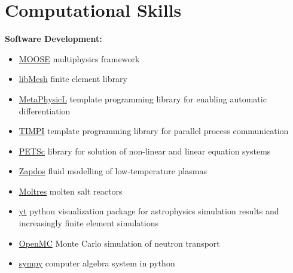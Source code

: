 \documentclass[a4paper,10pt]{article} %
\newcounter{magicrownumbers}
\begin{document}



\setcounter{magicrownumbers}{0}



\FloatBarrier


\section{Computational Skills}

\textbf{Software Development:}
\begin{itemize}[noitemsep]
\item \href{https://github.com/idaholab/moose}{MOOSE} multiphysics framework
\item \href{https://github.com/libmesh/libmesh}{libMesh} finite element library
\item \href{https://github.com/roystgnr/metaphysicl}{MetaPhysicL} template
  programming library for enabling automatic differentiation
\item \href{https://github.com/libmesh/timpi}{TIMPI} template programming
  library for parallel process communication
\item \href{https://bitbucket.org/petsc/petsc}{PETSc} library for solution of non-linear and linear equation systems
\item \href{https://github.com/shannon-lab/zapdos}{Zapdos} fluid modelling of low-temperature plasmas
\item \href{https://github.com/arfc/moltres}{Moltres} molten salt reactors
\item \href{https://bitbucket.org/yt/yt\_analysis}{yt} python visualization package for astrophysics simulation results and increasingly finite element simulations
\item \href{https://github.com/mit-crpg/openmc}{OpenMC} Monte Carlo simulation of neutron transport
\item \href{https://github.com/sympy/sympy}{sympy} computer algebra system in python
\end{itemize}
\end{document}
